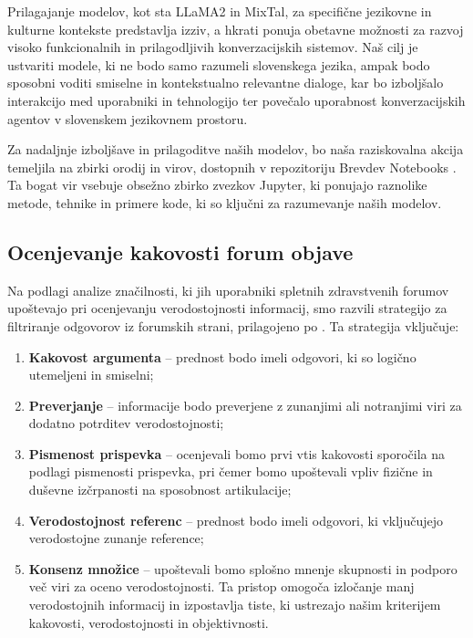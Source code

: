 \documentclass[fleqn,moreauthors,10pt]{ds_report}
\begin{document}
Prilagajanje modelov, kot sta LLaMA2 in MixTal, za specifične jezikovne in kulturne kontekste predstavlja izziv, a hkrati ponuja obetavne možnosti za razvoj visoko funkcionalnih in prilagodljivih konverzacijskih sistemov. Naš cilj je ustvariti modele, ki ne bodo samo razumeli slovenskega jezika, ampak bodo sposobni voditi smiselne in kontekstualno relevantne dialoge, kar bo izboljšalo interakcijo med uporabniki in tehnologijo ter povečalo uporabnost konverzacijskih agentov v slovenskem jezikovnem prostoru.

Za nadaljnje izboljšave in prilagoditve naših modelov, bo naša raziskovalna akcija temeljila na zbirki orodij in virov, dostopnih v repozitoriju Brevdev Notebooks \cite{brevdev}. Ta bogat vir vsebuje obsežno zbirko zvezkov Jupyter, ki ponujajo raznolike metode, tehnike in primere kode, ki so ključni za razumevanje naših modelov.

\subsection*{Ocenjevanje kakovosti forum objave}

Na podlagi analize značilnosti, ki jih uporabniki spletnih zdravstvenih forumov upoštevajo pri ocenjevanju verodostojnosti informacij, smo razvili strategijo za filtriranje odgovorov iz forumskih strani, prilagojeno po \cite{fan2013online, sauls2018perceived, zummo2015}. Ta strategija vključuje:
\begin{enumerate}
    \item \textbf{Kakovost argumenta} -- prednost bodo imeli odgovori, ki so logično utemeljeni in smiselni;
    \item \textbf{Preverjanje} -- informacije bodo preverjene z zunanjimi ali notranjimi viri za dodatno potrditev verodostojnosti;
    \item \textbf{Pismenost prispevka} -- ocenjevali bomo prvi vtis ka\-ko\-vo\-sti sporočila na podlagi pismenosti prispevka, pri čemer bomo upoštevali vpliv fizične in duševne iz\-čr\-pa\-no\-sti na sposobnost artikulacije;
    \item  \textbf{Verodostojnost referenc} -- prednost bodo imeli odgovori, ki vključujejo verodostojne zunanje reference; 
    \item \textbf{Konsenz množice} -- upoštevali bomo splošno mnenje skupnosti in podporo več viri za oceno verodostojnosti. Ta pristop omogoča izločanje manj verodostojnih informacij in izpostavlja tiste, ki ustrezajo našim kriterijem kakovosti, verodostojnosti in objektivnosti.
\end{enumerate}
\end{document}
